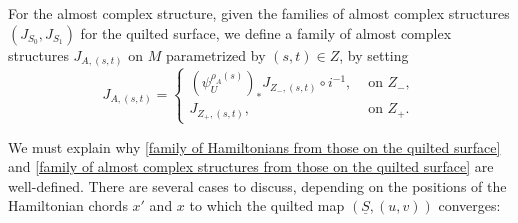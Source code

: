 \documentclass{amsart}
\numberwithin{equation}{section}
\numberwithin{figure}{section}
\begin{document}
	For the almost complex structure, given the families of almost complex structures $(J_{S_{0}}, J_{S_{1}})$ for the quilted surface, we define a family of almost complex structures $J_{A, (s, t)}$ on $M$ parametrized by $(s, t) \in Z$, by setting
\begin{equation}\label{family of almost complex structures from those on the quilted surface}
J_{A, (s, t)} = 
\begin{cases}
(\psi_{U}^{\rho_{A}(s)})_{*} J_{Z_{-}, (s, t)} \circ i^{-1}, &\text{ on } Z_{-},\\
J_{Z_{+}, (s, t)}, &\text{ on } Z_{+}.
\end{cases}
\end{equation} \par

	We must explain why \eqref{family of Hamiltonians from those on the quilted surface} and \eqref{family of almost complex structures from those on the quilted surface} are well-defined. There are several cases to discuss, depending on the positions of the Hamiltonian chords $x'$ and $x$ to which the quilted map $(\underline{S}, (u, v))$ converges:
\end{document}
